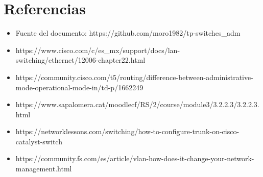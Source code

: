 \documentclass{article}
\begin{document}
\newpage
\section{Referencias}
\begin{itemize}
    \item Fuente del documento: https://github.com/moro1982/tp-switches\_adm
    \item https://www.cisco.com/c/es\_mx/support/docs/lan-switching/ethernet/12006-chapter22.html
    \item https://community.cisco.com/t5/routing/difference-between-administrative-mode-operational-mode-in/td-p/1662249
    \item https://www.sapalomera.cat/moodlecf/RS/2/course/module3/3.2.2.3/3.2.2.3.html
    \item https://networklessons.com/switching/how-to-configure-trunk-on-cisco-catalyst-switch
    \item https://community.fs.com/es/article/vlan-how-does-it-change-your-network-management.html
\end{itemize} \\
\end{document}
